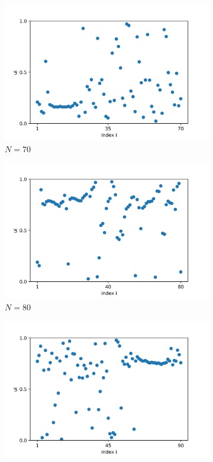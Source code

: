 \documentclass[a4paper,12pt]{article}
\begin{document}
\begin{figure}[H]
\begin{subfigure}{.32\textwidth}
  \centering
  \includegraphics[width=1\linewidth]{u_N=70.png}  
  \caption{$N=70$}
\end{subfigure}
\begin{subfigure}{.32\textwidth}
  \centering
  \includegraphics[width=1\linewidth]{u_N=80.png}  
  \caption{$N=80$}
\end{subfigure}
\hfill
\begin{subfigure}{.32\textwidth}
  \centering
  \includegraphics[width=1\linewidth]{u_N=90.png}  

\end{subfigure}
\end{figure}
\end{document}
